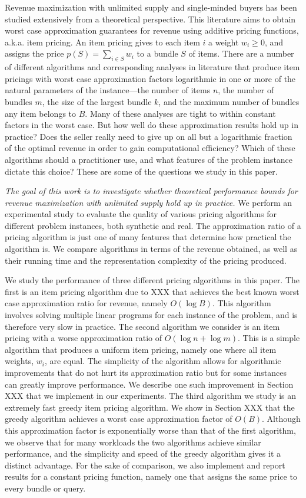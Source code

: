 Revenue maximization with unlimited supply and single-minded buyers has been studied extensively from a theoretical perspective. This literature aims to obtain worst case approximation guarantees for revenue using additive pricing functions, a.k.a. item pricing. An item pricing gives to each item $i$  a weight $w_i \geq 0$, and assigns the price $p(S) = \sum_{i \in S} w_i$ to a bundle $S$ of items. There are a number of different algorithms and corresponding analyses in literature that produce item pricings with worst case approximation factors logarithmic in one or more of the natural parameters of the instance---the number of items $n$, the number of bundles $m$, the size of the largest bundle $k$, and the maximum number of bundles any item belongs to $B$. Many of these analyses are tight to within constant factors in the worst case. But how well do these approximation results hold up in practice? Does the seller really need to give up on all but a logarithmic fraction of the optimal revenue in order to gain computational efficiency? Which of these algorithms should a practitioner use, and what features of the problem instance dictate this choice? These are some of the questions we study in this paper.

{\em The goal of this work is to investigate whether theoretical performance bounds for revenue maximization with unlimited supply hold up in practice.} We perform an experimental study to evaluate the quality of various pricing algorithms for different problem instances, both synthetic and real. The approximation ratio of a pricing algorithm is just one of many features that determine how practical the algorithm is. We compare algorithms in terms of the revenue obtained, as well as their running time and the representation complexity of the pricing produced.

We study the performance of three different pricing algorithms in this paper. The first is an item pricing algorithm due to XXX that achieves the best known worst case approximation ratio for revenue, namely $O(\log B)$. This algorithm involves solving multiple linear programs for each instance of the problem, and is therefore very slow in practice. The second algorithm we consider is an item pricing with a worse approximation ratio of $O(\log n+\log m)$. This is a simple algorithm that produces a uniform item pricing, namely one where all item weights, $w_i$, are equal. The simplicity of the algorithm allows for algorithmic improvements that do not hurt its approximation ratio but for some instances can greatly improve performance. We describe one such improvement in Section XXX that we implement in our experiments. The third algorithm we study is an extremely fast greedy item pricing algorithm. We show in Section XXX that the greedy algorithm achieves a worst case approximation factor of $O(B)$. Although this approximation factor is exponentially worse than that of the first algorithm, we observe that for many workloads the two algorithms achieve similar performance, and the simplicity and speed of the greedy algorithm gives it a distinct advantage. For the sake of comparison, we also implement and report results for a constant pricing function, namely one that assigns the same price to every bundle or query.

